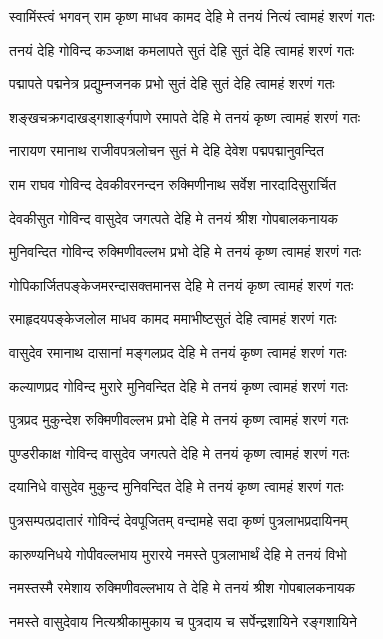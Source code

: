 \twolineshloka
{स्वामिंस्त्वं भगवन् राम कृष्ण माधव कामद}
{देहि मे तनयं नित्यं त्वामहं शरणं गतः}%

\twolineshloka
{तनयं देहि गोविन्द कञ्जाक्ष कमलापते}
{सुतं देहि सुतं देहि त्वामहं शरणं गतः}%

\twolineshloka
{पद्मापते पद्मनेत्र प्रद्युम्नजनक प्रभो}
{सुतं देहि सुतं देहि त्वामहं शरणं गतः}%

\twolineshloka
{शङ्खचक्रगदाखड्गशार्ङ्गपाणे रमापते}
{देहि मे तनयं कृष्ण त्वामहं शरणं गतः}%

\twolineshloka
{नारायण रमानाथ राजीवपत्रलोचन}
{सुतं मे देहि देवेश पद्मपद्मानुवन्दित}%

\twolineshloka
{राम राघव गोविन्द देवकीवरनन्दन}
{रुक्मिणीनाथ सर्वेश नारदादिसुरार्चित}%

\twolineshloka
{देवकीसुत गोविन्द वासुदेव जगत्पते}
{देहि मे तनयं श्रीश गोपबालकनायक}%

\twolineshloka
{मुनिवन्दित गोविन्द रुक्मिणीवल्लभ प्रभो}
{देहि मे तनयं कृष्ण त्वामहं शरणं गतः}%

\twolineshloka
{गोपिकार्जितपङ्केजमरन्दासक्तमानस}
{देहि मे तनयं कृष्ण त्वामहं शरणं गतः}%

\twolineshloka
{रमाहृदयपङ्केजलोल माधव कामद}
{ममाभीष्टसुतं देहि त्वामहं शरणं गतः}%

\twolineshloka
{वासुदेव रमानाथ दासानां मङ्गलप्रद}
{देहि मे तनयं कृष्ण त्वामहं शरणं गतः}%

\twolineshloka
{कल्याणप्रद गोविन्द मुरारे मुनिवन्दित}
{देहि मे तनयं कृष्ण त्वामहं शरणं गतः}%

\twolineshloka
{पुत्रप्रद मुकुन्देश रुक्मिणीवल्लभ प्रभो}
{देहि मे तनयं कृष्ण त्वामहं शरणं गतः}%

\twolineshloka
{पुण्डरीकाक्ष गोविन्द वासुदेव जगत्पते}
{देहि मे तनयं कृष्ण त्वामहं शरणं गतः}%

\twolineshloka
{दयानिधे वासुदेव मुकुन्द मुनिवन्दित}
{देहि मे तनयं कृष्ण त्वामहं शरणं गतः}%

\twolineshloka
{पुत्रसम्पत्प्रदातारं गोविन्दं देवपूजितम्}
{वन्दामहे सदा कृष्णं पुत्रलाभप्रदायिनम्}%

\twolineshloka
{कारुण्यनिधये गोपीवल्लभाय मुरारये}
{नमस्ते पुत्रलाभार्थं देहि मे तनयं विभो}%

\twolineshloka
{नमस्तस्मै रमेशाय रुक्मिणीवल्लभाय ते}
{देहि मे तनयं श्रीश गोपबालकनायक}%

\twolineshloka
{नमस्ते वासुदेवाय नित्यश्रीकामुकाय च}
{पुत्रदाय च सर्पेन्द्रशायिने रङ्गशायिने}%

